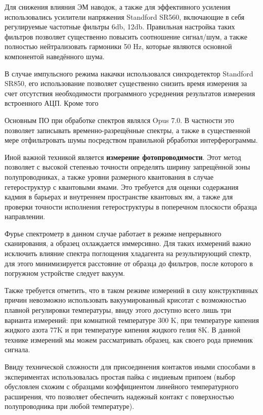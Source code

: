 \documentclass[../main.tex]{subfiles}
\begin{document}
    Для снижения влияния ЭМ наводок, а также для эффективного усиления использовались 
    усилители напряжения Standford SR560, включающие в себя регулируемые частотные фильтры 6db, 12db. 
    Правильная настройка таких фильтров позволяет существенно повысить соотношение сигнал/шум, 
    а также полностью нейтрализовать гармоники 50 Hz, которые являются основной компонентой наведённого шума.

    В случае импульсного режима накачки использовался синхродетектор Standford SR850, его использование
    позволяет существенно снизить время измерения за счет отсутствия необходимости программного усреднения 
    результатов измерения встроенного АЦП. Кроме того

    Основным ПО при обработке спектров являлся Opus 7.0. В частности это позволяет записывать временно-разрещённые спектры,
    а также в существенной мере отфильтровать шумы посредством правильной рбработки интерферограммы.

    Иной важной техникой является \textbf{измерение фотопроводимости}. Этот метод позволяет с высокой степенью точности
    определять ширину запрещённой зоны полупроводниках, а также уровни размерного квантования в случае гетероструктур
    с квантовыми ямами. Это требуется для оценки содержания кадмия в барьерах и внутреннем пространстве квантовых ям, а также
    для проверки точности исполнения гетероструктуры в поперечном плоскости образца направлении.

    Фурье спектрометр в данном случае работает в режиме непрерывного сканирования, а образец охлаждается иммерсивно.
    Для таких ихмерений важно исключить влияние спектра поглощения хладагента на результирующий спектр, для этого
    минимизируется расстояние от образца до фильтров, после которого в погружном устройстве следует вакуум.
    
    Также требуется отметить, что в таком режиме измерений в силу конструктивных причин невозможно использовать вакуумированный
    крисотат с возможностью плавной регулировки температуры, ввиду этого доступно всего лишь три варианта измерений:
    при комнатной температуре 300 K, при температуре кипения жидкого азота 77K и при температуре кипения жидкого гелия 8K. В
    данной технике измерений мы можем рассматривать образец, как своего рода приемник сигнала. 
    
    Ввиду технической сложности для присоединения контактов иными способами в экспериментах использовалась простая пайка
    с индиевым припоем (выбор обусловлен схожим с образцами коэффициентом линейного температурного расширения, что позволяет 
    обеспечить надежный контакт с поверхностью полупроводника при любой температуре).
\end{document}
